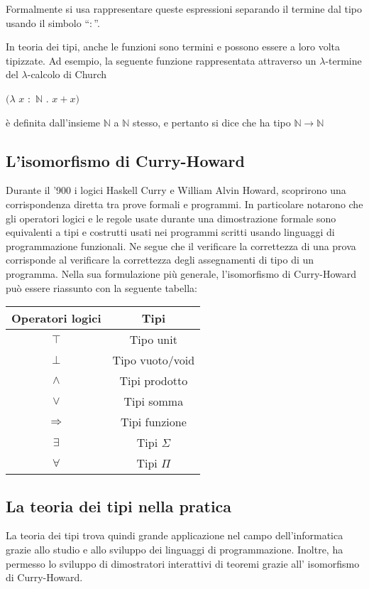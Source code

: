 \documentclass[12pt,a4paper]{mimosis}
\begin{document}
Formalmente si usa rappresentare queste espressioni separando il termine dal tipo usando
il simbolo ``$:$''. 

In teoria dei tipi, anche le funzioni sono termini e possono essere
a loro volta tipizzate. Ad esempio, la seguente funzione rappresentata attraverso un $\lambda$-termine
del $\lambda$-calcolo di Church 
\begin{center}
  $(\lambda$ $x$ $:$ $\mathbb{N}$ $.$ $x + x)$
\end{center}

è definita dall'insieme $\mathbb{N}$ a $\mathbb{N}$ stesso, e pertanto si dice che ha tipo $\mathbb{N} \rightarrow \mathbb{N}$

\subsection{L'isomorfismo di Curry-Howard}
Durante il '900 i logici Haskell Curry e William Alvin Howard, scoprirono una
corrispondenza diretta tra prove formali e programmi. In particolare notarono
che gli operatori logici e le regole usate durante una dimostrazione formale
sono equivalenti a tipi e costrutti usati nei programmi scritti usando linguaggi
di programmazione funzionali. Ne segue che il verificare la correttezza di una
prova corrisponde al verificare la correttezza degli assegnamenti di tipo di un
programma. Nella sua formulazione più generale, l'isomorfismo di Curry-Howard
può essere riassunto con la seguente tabella:

\begin{center}
  \begin{tabular}{ | c | c |}
    \hline
    \textbf{Operatori logici} & \textbf{Tipi} \\
    \hline
    $\top$ & Tipo unit \\
    \hline
    $\bot $ & Tipo vuoto/void \\
    \hline
   $\wedge$ & Tipi prodotto \\  
    \hline
   $\vee$ & Tipi somma \\
    \hline
   $\Rightarrow$ & Tipi funzione \\ 
    \hline
   $\exists$ & Tipi $\Sigma$ \\ 
    \hline
    $\forall $ & Tipi $\Pi$ \\ 
    \hline

  \end{tabular}
\end{center}

\subsection{La teoria dei tipi nella pratica}
La teoria dei tipi trova quindi grande applicazione nel campo dell'informatica
grazie allo studio e allo sviluppo dei linguaggi di programmazione. Inoltre,
ha permesso lo sviluppo di dimostratori interattivi di teoremi grazie all'
isomorfismo di Curry-Howard.
\end{document}
